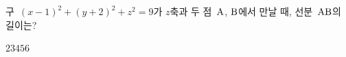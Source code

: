 구~$(x-1)^2+(y+2)^2+z^2=9$가 $z$축과 두 점~$\mathrm{A}$, $\mathrm{B}$에서 만날 때, 선분~$\mathrm{AB}$의 길이는?
\begin{choices32}{$2$}{$3$}{$4$}{$5$}{$6$}\end{choices32}
